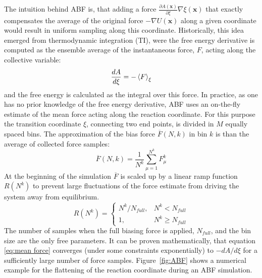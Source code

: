 The intuition behind ABF is, that adding a force $\frac{\partial A(\textbf{x})}{\partial \xi}\nabla\xi(\textbf{x})$ that exactly compensates the average of the original force $-\nabla U(\textbf{x})$ along a given coordinate would result in uniform sampling along this coordinate.\autocite{comer2015adaptive}
Historically, this idea emerged from thermodynamic integration (TI), were the free energy derivative  is computed as the ensemble average of the instantaneous force, $F$, acting along the collective variable:
\begin{equation}
\frac{dA}{d\xi} = -\braket{F}_{\xi}
\end{equation}
and the free energy is calculated as the integral over this force.\autocite{kirkwood1935statistical,zwanzig1954high}
In practice, as one has no prior knowledge of the free energy derivative, ABF uses an on-the-fly estimate of the mean force acting along the reaction coordinate. For this purpose the transition coordinate $\xi$, connecting two end points, is divided in $M$ equally spaced bins. The approximation of the bias force $\overline{F}(N,k)$ in bin $k$ is than the average of collected force samples:\autocite{comer2015adaptive}
\begin{equation}
  \overline{F}(N,k) = \frac{1}{N^{k}} \sum_{\mu=1}^{N^{k}} F_{\mu}^{k}
  \label{eq:mean force}
\end{equation}
At the beginning of the simulation $\overline{F}$ is scaled up by a linear ramp function $R(N^k)$ to prevent large fluctuations of the force estimate from driving the system away from equilibrium.
\begin{equation}
  R(N^k)=\left\{\begin{array}{ll} N^k/N_{full}, & N^{k} < N_{full} \\
                                             1, & N^{k} \geq  N_{full}
                \end{array}\right.
  \label{eq:ramp}
\end{equation}
The number of samples when the full biasing force is applied, $N_{full}$, and the bin size are the only free parameters.
It can be proven mathematically, that equation \ref{eq:mean force} converges (under some constraints exponentially) to $-dA/d\xi$ for a sufficiently large number of force samples.\autocite{alrachid2015long}
Figure~\ref{fig:ABF} shows a numerical example for the flattening of the reaction coordinate during an ABF simulation.

